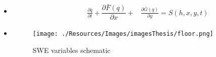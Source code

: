 \begin{frame}
\begin{minipage}{0.35\textwidth}
\begin{itemize}
\begin{align*}
\begin{matrix}[1.0]
\text{\hspace{5pt}\myTUMdarkblue{$\rightarrow\ $\textit{discharge in y}}}
\end{matrix}
\end{align*}
\item<2->[]
\begin{align*}
\qquad \qquad \frac{\partial \bar{q}}{\partial t} + \dfrac{\partial \bar{F}(q)}{\partial x} + &\frac{\partial \bar{G}(q)}{\partial y} = S(h,x,y,t)
\end{align*}
\end{itemize}
\end{minipage}
\begin{minipage}{0.45\textwidth}  
\begin{itemize}[leftmargin=*]
\item<1->[]
\vspace{2cm}
\begin{center}
\begin{figure}
\texttt{[image: ./Resources/Images/imagesThesis/floor.png]}%
\caption{SWE variables schematic}
\label{fig:swechemedit}
\end{figure}
\end{center}
\end{itemize}
\end{minipage}

\end{frame}
\clearpage


